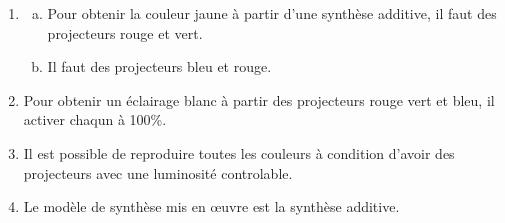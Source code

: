 \documentclass[12pt, a4paper]{article}
\begin{document}
    \begin{Exercise}[number={19}]
        \begin{enumerate}[1.]
            \item   \begin{enumerate}[a.]
                        \item	Pour obtenir la couleur jaune à partir d'une synthèse additive, il faut des projecteurs rouge et vert.
                        \item   Il faut des projecteurs bleu et rouge.
                    \end{enumerate}	
            \item   Pour obtenir un éclairage blanc à partir des projecteurs rouge vert et bleu, il activer chaqun à 100\%.
            \item   Il est possible de reproduire toutes les couleurs à condition d'avoir des projecteurs avec une luminosité controlable.
            \item   Le modèle de synthèse mis en œuvre est la synthèse additive.
        \end{enumerate}
    \end{Exercise}

    \pagebreak
\end{document}
